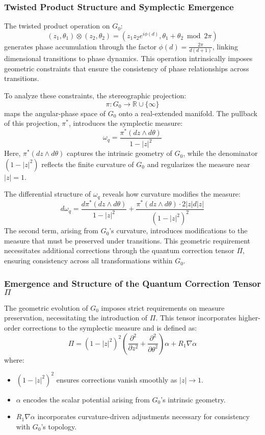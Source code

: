 \documentclass[10pt]{article}
\begin{document}
\subsubsection{Twisted Product Structure and Symplectic Emergence}

The twisted product operation on $G_0$:
\[
(z_1, \theta_1) \otimes (z_2, \theta_2) = \left(z_1 z_2 e^{i\phi(d)}, \theta_1 + \theta_2 \bmod 2\pi\right)
\]
generates phase accumulation through the factor $\phi(d) = \frac{2\pi}{d(d+1)}$, linking dimensional transitions to phase dynamics. This operation intrinsically imposes geometric constraints that ensure the consistency of phase relationships across transitions.

To analyze these constraints, the stereographic projection:
\[
\pi: G_0 \to \mathbb{R} \cup \{\infty\}
\]
maps the angular-phase space of $G_0$ onto a real-extended manifold. The pullback of this projection, $\pi^*$, introduces the symplectic measure:
\[
\omega_q = \frac{\pi^*(dz \wedge d\theta)}{1 - |z|^2}
\]
Here, $\pi^*(dz \wedge d\theta)$ captures the intrinsic geometry of $G_0$, while the denominator $(1 - |z|^2)$ reflects the finite curvature of $G_0$ and regularizes the measure near $|z| = 1$.

The differential structure of $\omega_q$ reveals how curvature modifies the measure:
\[
d\omega_q = \frac{d\pi^*(dz \wedge d\theta)}{1 - |z|^2} + \frac{\pi^*(dz \wedge d\theta) \cdot 2|z| d|z|}{(1 - |z|^2)^2}
\]
The second term, arising from $G_0$'s curvature, introduces modifications to the measure that must be preserved under transitions. This geometric requirement necessitates additional corrections through the quantum correction tensor $\Pi$, ensuring consistency across all transformations within $G_0$.

\subsubsection{Emergence and Structure of the Quantum Correction Tensor $\Pi$}

The geometric evolution of $G_0$ imposes strict requirements on measure preservation, necessitating the introduction of $\Pi$. This tensor incorporates higher-order corrections to the symplectic measure and is defined as:
\[
\Pi = (1 - |z|^2)^2 \left( \frac{\partial^2}{\partial z^2} + \frac{\partial^2}{\partial \theta^2} \right)\alpha + R_1 \nabla \alpha
\]
where:

\begin{itemize}
    \item $(1 - |z|^2)^2$ ensures corrections vanish smoothly as $|z| \to 1$.
    \item $\alpha$ encodes the scalar potential arising from $G_0$'s intrinsic geometry.
    \item $R_1 \nabla \alpha$ incorporates curvature-driven adjustments necessary for consistency with $G_0$'s topology.
\end{itemize}
\end{document}
